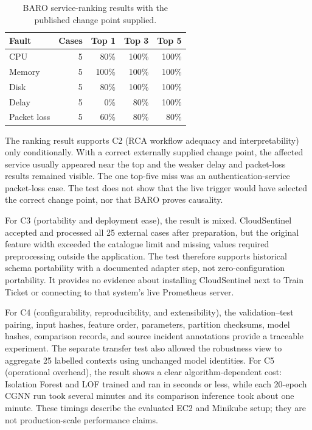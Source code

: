 \begin{table}[H]
    \centering
    \small
    \caption{BARO service-ranking results with the published change point supplied.}
    \label{tab:h9-rcaeval-baro-results}
    \begin{tabular}{|l|r|r|r|r|}
        \hline
        Fault & Cases & Top 1 & Top 3 & Top 5 \\
        \hline
        CPU & 5 & 80\% & 100\% & 100\% \\
        Memory & 5 & 100\% & 100\% & 100\% \\
        Disk & 5 & 80\% & 100\% & 100\% \\
        Delay & 5 & 0\% & 80\% & 100\% \\
        Packet loss & 5 & 60\% & 80\% & 80\% \\
        \hline
    \end{tabular}
\end{table}

The ranking result supports C2 (RCA workflow adequacy and interpretability) only conditionally. With a correct externally supplied change point, the affected service usually appeared near the top and the weaker delay and packet-loss results remained visible. The one top-five miss was an authentication-service packet-loss case. The test does not show that the live trigger would have selected the correct change point, nor that BARO proves causality.

For C3 (portability and deployment ease), the result is mixed. CloudSentinel accepted and processed all 25 external cases after preparation, but the original feature width exceeded the catalogue limit and missing values required preprocessing outside the application. The test therefore supports historical schema portability with a documented adapter step, not zero-configuration portability. It provides no evidence about installing CloudSentinel next to Train Ticket or connecting to that system's live Prometheus server.

For C4 (configurability, reproducibility, and extensibility), the validation--test pairing, input hashes, feature order, parameters, partition checksums, model hashes, comparison records, and source incident annotations provide a traceable experiment. The separate transfer test also allowed the robustness view to aggregate 25 labelled contexts using unchanged model identities. For C5 (operational overhead), the result shows a clear algorithm-dependent cost: Isolation Forest and LOF trained and ran in seconds or less, while each 20-epoch CGNN run took several minutes and its comparison inference took about one minute. These timings describe the evaluated EC2 and Minikube setup; they are not production-scale performance claims.

